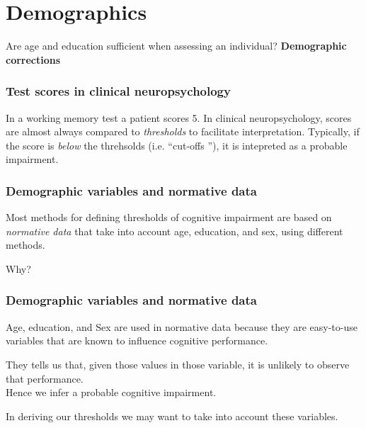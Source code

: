 \documentclass{beamer}
\newcommand{\oq}{``}
\newcommand{\cq}{''}
\begin{document}
\section{Demographics}

\begin{frame}
\begin{center}
\item Are age and education sufficient when assessing an individual?
\vfill %
\textbf{\Large Demographic corrections}
\end{center}
\end{frame}


\begin{frame}
\frametitle{Test scores in clinical neuropsychology}
In a working memory test a patient scores 5.
\vfill
In clinical neuropsychology, scores are almost always compared to \emph{thresholds} to facilitate interpretation.
\vfill
Typically, if the score is \emph{below} the threhsolds (i.e. \oq cut-offs \cq), it is intepreted as a probable impairment.
\end{frame}
%


\begin{frame}
\frametitle{Demographic variables and normative data}
Most methods for defining thresholds of cognitive impairment are based on \emph{normative data} that take into account age, education, and sex, using different methods.
\vfill
\begin{center}
\LARGE{ Why?}
\end{center}
\end{frame}

\begin{frame}
\frametitle{Demographic variables and normative data}
Age, education, and Sex are used in normative data because they are easy-to-use variables that are known to influence cognitive performance.
\vfill %
\begin{center}
They tells us that, given those values in those variable, it is unlikely to observe that performance. \\
Hence we infer a probable cognitive impairment.
\end{center}
\vfill %
In deriving our thresholds we may want to take into account these variables.
\end{frame}
\end{document}

